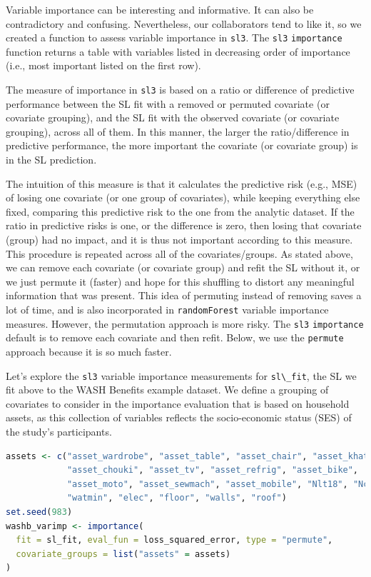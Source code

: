 \documentclass[
  12pt, krantz2,
]{krantz}
\newcommand{\passthrough}[1]{#1}
\newcommand{\1}{\mathbbm{1}}
\theoremstyle{definition}
\theoremstyle{definition}
\theoremstyle{definition}
\theoremstyle{definition}
\theoremstyle{remark}
\begin{document}
Variable importance can be interesting and informative. It can also be
contradictory and confusing. Nevertheless, our collaborators tend to like it,
so we created a function to assess variable importance in \passthrough{\lstinline!sl3!}. The \passthrough{\lstinline!sl3!}
\passthrough{\lstinline!importance!} function returns a table with variables listed in decreasing order
of importance (i.e., most important listed on the first row).

The measure of importance in \passthrough{\lstinline!sl3!} is based on a ratio or difference of
predictive performance between the SL fit with a removed or permuted
covariate (or covariate grouping), and the SL fit with the observed covariate (or
covariate grouping), across all of them. In this manner, the larger the
ratio/difference in predictive performance, the more important the covariate
(or covariate group) is in the SL prediction.

The intuition of this measure is that it calculates the predictive risk (e.g.,
MSE) of losing one covariate (or one group of covariates), while keeping
everything else fixed, comparing this predictive risk to the one from the
analytic dataset. If the ratio in predictive risks is one, or the difference is
zero, then losing that covariate (group) had no impact, and it is thus not
important according to this measure. This procedure is repeated across all of
the covariates/groups. As stated above, we can remove each covariate (or
covariate group) and refit the SL without it, or we just permute it (faster) and
hope for this shuffling to distort any meaningful information that was present.
This idea of permuting instead of removing saves a lot of time, and is also
incorporated in \passthrough{\lstinline!randomForest!} variable importance measures. However, the
permutation approach is more risky. The \passthrough{\lstinline!sl3!} \passthrough{\lstinline!importance!} default is to remove
each covariate and then refit. Below, we use the \passthrough{\lstinline!permute!} approach because it
is so much faster.

Let's explore the \passthrough{\lstinline!sl3!} variable importance measurements for \passthrough{\lstinline!sl\_fit!}, the
SL we fit above to the WASH Benefits example dataset. We define a grouping
of covariates to consider in the importance evaluation that is based on
household assets, as this collection of variables reflects the socio-economic
status (SES) of the study's participants.

\begin{lstlisting}[language=R]
assets <- c("asset_wardrobe", "asset_table", "asset_chair", "asset_khat",
            "asset_chouki", "asset_tv", "asset_refrig", "asset_bike", 
            "asset_moto", "asset_sewmach", "asset_mobile", "Nlt18", "Ncomp", 
            "watmin", "elec", "floor", "walls", "roof")
set.seed(983)
washb_varimp <- importance(
  fit = sl_fit, eval_fun = loss_squared_error, type = "permute", 
  covariate_groups = list("assets" = assets)
)
\end{lstlisting}
\end{document}
